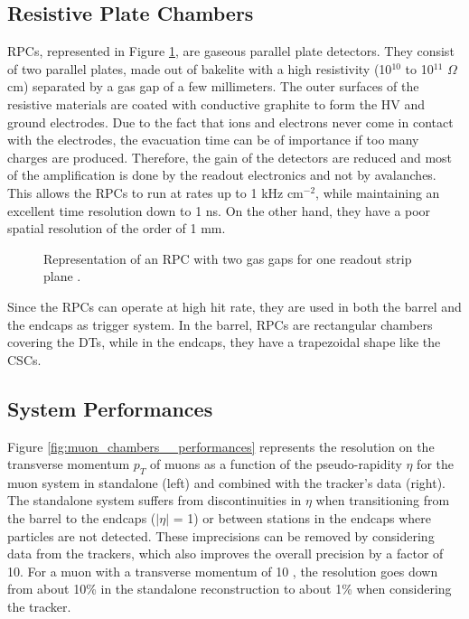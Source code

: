     		\subsection{Resistive Plate Chambers}
    		\label{sec:muon_chambers__resistive_plate_chambers}

    			RPCs, represented in Figure \ref{fig:muon_chambers__rpc}, are gaseous parallel plate detectors. They consist of two parallel plates, made out of bakelite with a high resistivity (10$ ^{10} $ to 10$ ^{11} $ $ \Omega $ cm) separated by a gas gap of a few millimeters. The outer surfaces of the resistive materials are coated with conductive graphite to form the HV and ground electrodes. Due to the fact that ions and electrons never come in contact with the electrodes, the evacuation time can be of importance if too many charges are produced. Therefore, the gain of the detectors are reduced and most of the amplification is done by the readout electronics and not by avalanches. This allows the RPCs to run at rates up to 1 kHz cm$ ^{-2} $, while maintaining an excellent time resolution down to 1 ns. On the other hand, they have a poor spatial resolution of the order of 1 mm. \\

    			\begin{figure}[h!]
    				\centering
    				\caption{Representation of an RPC with two gas gaps for one readout strip plane \Cite{These_Karol}.}
    				\label{fig:muon_chambers__rpc}
    			\end{figure}

    			Since the RPCs can operate at high hit rate, they are used in both the barrel and the endcaps as trigger system. In the barrel, RPCs are rectangular chambers covering the DTs, while in the endcaps, they have a trapezoidal shape like the CSCs.

    		\subsection{System Performances}
    		\label{sec:muon_chambers__system_performances}

    			Figure \ref{fig:muon_chambers__performances} represents the resolution on the transverse momentum $ p_T $ of muons as a function of the pseudo-rapidity $ \eta $ for the muon system in standalone (left) and combined with the tracker's data (right). The standalone system suffers from discontinuities in $ \eta $ when transitioning from the barrel to the endcaps ($ | \eta | $ = 1) or between stations in the endcaps where particles are not detected. These imprecisions can be removed by considering data from the trackers, which also improves the overall precision by a factor of 10. For a muon with a transverse momentum of 10 \GeVc{}, the resolution goes down from about 10\% in the standalone reconstruction to about 1\% when considering the tracker.

